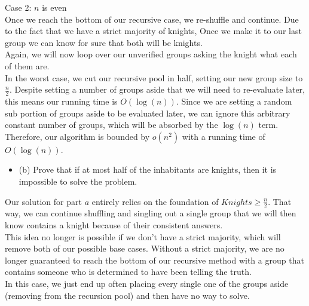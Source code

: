 \documentclass{article}
\begin{document}
\begin{enumerate}
\newline 
Case 2: $n$ is even \\
Once we reach the bottom of our recursive case, we re-shuffle and continue. Due to the fact that we have a strict majority of knights, Once we make it to our last group we can know for sure that both will be knights. \\
Again, we will now loop over our unverified groups asking the knight what each of them are. \\
\newline 
In the worst case, we cut our recursive pool in half, setting our new group size to $\frac{n}{2}$. Despite setting a number of groups aside that we will need to re-evaluate later, this means our running time is $O(\log(n))$. Since we are setting a random sub portion of groups aside to be evaluated later, we can ignore this arbitrary constant number of groups, which will be absorbed by the $\log(n)$ term. \\ 
\newline 
Therefore, our algorithm is bounded by $o(n^{2})$ with a running time of $O(\log(n))$. \\









\begin{itemize}
    \item (b) Prove that if at most half of the inhabitants are knights, then it is impossible to solve the problem.
\end{itemize}
Our solution for part $a$ entirely relies on the foundation of $Knights \geq \frac{n}{2}$. That way, we can continue shuffling and singling out a single group that we will then know contains a knight because of their consistent answers. \\
\newline 
This idea no longer is possible if we don't have a strict majority, which will remove both of our possible base cases. Without a strict majority, we are no longer guaranteed to reach the bottom of our recursive method with a group that contains someone who is determined to have been telling the truth. \\
\newline 
In this case, we just end up often placing every single one of the groups aside (removing from the recursion pool) and then have no way to solve. 








\end{enumerate}
\end{document}
